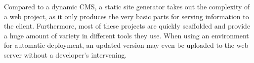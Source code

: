 Compared to a dynamic CMS, a static site generator takes out the complexity of a web project, as it only produces the very basic parts for serving information to the client. Furthermore, most of these projects are quickly scaffolded and provide a huge amount of variety in different tools they use. When using an environment for automatic deployment, an updated version may even be uploaded to the web server without a developer's intervening.





